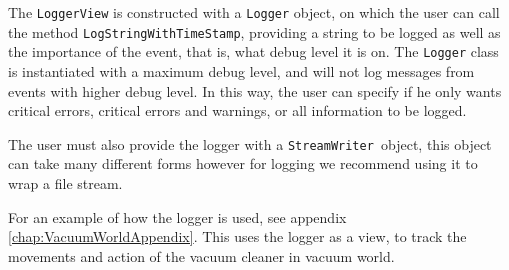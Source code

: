 The \texttt{LoggerView} is constructed with a \texttt{Logger} object,
on which the user can call the method \texttt{LogStringWithTimeStamp},
providing a string to be logged as well as the importance of the event,
that is, what debug level it is on. The \texttt{Logger} class is instantiated
with a maximum debug level, and will not log messages from events
with higher debug level. In this way, the user can specify if he only
wants critical errors, critical errors and warnings, or all information
to be logged.

The user must also provide the logger with a \texttt{StreamWriter
}object, this object can take many different forms however for logging
we recommend using it to wrap a file stream. 

For an example of how the logger is used, see appendix \ref{chap:VacuumWorldAppendix}.
This uses the logger as a view, to track the movements and action
of the vacuum cleaner in vacuum world.
